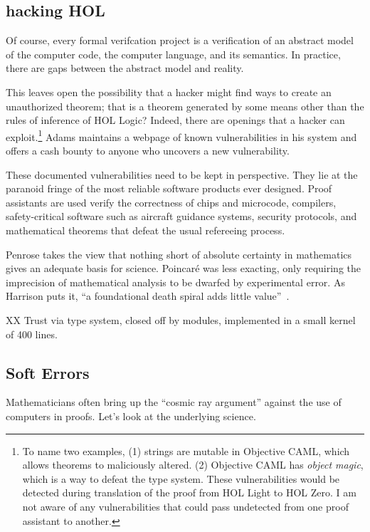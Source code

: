 \documentclass{llncs}
\begin{document}
\subsection{hacking HOL}

Of course, every formal verifcation project is a verification of an
abstract model of the computer code, the computer language, and its
semantics.  In practice, there are gaps between the abstract
model and reality.

  
This leaves open the possibility that a hacker might find ways to
create an unauthorized theorem; that is a theorem generated by some
means other than the rules of inference of HOL Logic?  Indeed, there
are openings that a hacker can exploit.\footnote{To name two examples,
  (1) strings are mutable in Objective CAML, which allows theorems to
  maliciously altered.  (2) Objective CAML has {\it object magic},
  which is a way to defeat the type system.  These vulnerabilities
  would be detected during translation of the proof from HOL Light to
  HOL Zero.  I am not aware of any vulnerabilities that could pass
  undetected from one proof assistant to another.}  Adams maintains a
webpage of known vulnerabilities in his system and offers a cash
bounty to anyone who uncovers a new vulnerability.

These documented vulnerabilities need to be kept in perspective.  They
lie at the paranoid fringe of the most reliable software products ever
designed. Proof assistants are used verify the correctness of chips
and microcode, compilers, safety-critical software such as aircraft
guidance systems, security protocols, and mathematical theorems that
defeat the usual refereeing process.  

Penrose takes the view that nothing short of absolute certainty in
mathematics gives an adequate basis for science.  Poincar\'e was less
exacting, only requiring the imprecision of mathematical analysis to be
dwarfed by experimental error.  As Harrison puts it, 
``a foundational death spiral adds little value''~\cite{harrison-pm}.



XX Trust via type system, closed off by modules, implemented in a small
kernel of 400 lines.


\subsection{Soft Errors}\label{sec:soft}

Mathematicians often bring up the ``cosmic ray argument'' against the use
of computers in proofs.  Let's look at the underlying science.
\end{document}
